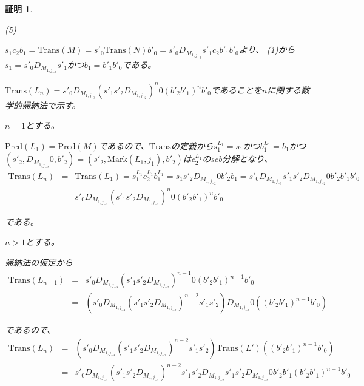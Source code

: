 \documentclass[dvipdfmx,uplatex]{jsarticle}
\theoremstyle{customnonumberbreakfortheorem}
\theoremstyle{customnonumberbreakforproof}
\newtheorem{hideableproof}{証明}
\begin{document}
\begin{hideableproof}
\begin{indented}
		\item
		\item (5)
		\item \(s_1 c_2 b_1 = \textrm{Trans}(M) = s'_0 \textrm{Trans}(N) b'_0 = s'_0 D_{M_{1,j_{-3}}} s'_1 c_2 b'_1 b'_0\)より、 (1)から\(s_1 = s'_0 D_{M_{1,j_{-3}}} s'_1\)かつ\(b_1 = b'_1 b'_0\)である。
		\item \(\textrm{Trans}(L_n) = s'_0 D_{M_{1,j_{-3}}} (s'_1 s'_2 D_{M_{1,j_{-2}}})^n 0 (b'_2 b'_1)^n b'_0\)であることを\(n\)に関する数学的帰納法で示す。
		\item \(n = 1\)とする。
		\begin{indented}
			\item \(\textrm{Pred}(L_1) = \textrm{Pred}(M)\)であるので、\(\textrm{Trans}\)の定義から\(s_1^{L_1} = s_1\)かつ\(b_1^{L_1} = b_1\)かつ\((s'_2,D_{M_{1,j_{-2}}} 0,b'_2) = (s'_2,\textrm{Mark}(L_1,j_1),b'_2)\)は\(c_2^{L_1}\)のscb分解となり、
			\begin{eqnarray*}
			\textrm{Trans}(L_n) & = & \textrm{Trans}(L_1) = s_1^{L_1} c_2^{L_1} b_1^{L_1} = s_1 s'_2 D_{M_{1,j_{-2}}} 0 b'_2 b_1 = s'_0 D_{M_{1,j_{-3}}} s'_1 s'_2 D_{M_{1,j_{-2}}} 0 b'_2 b'_1 b'_0 \\
			& = & s'_0 D_{M_{1,j_{-3}}} (s'_1 s'_2 D_{M_{1,j_{-2}}})^n 0 (b'_2 b'_1)^n b'_0
			\end{eqnarray*}
			\item である。
		\end{indented}
		\item
		\item \(n > 1\)とする。
		\begin{indented}
			\item 帰納法の仮定から
			\begin{eqnarray*}
			\textrm{Trans}(L_{n-1}) & = & s'_0 D_{M_{1,j_{-3}}} (s'_1 s'_2 D_{M_{1,j_{-2}}})^{n-1} 0 (b'_2 b'_1)^{n-1} b'_0 \\
			& = & (s'_0 D_{M_{1,j_{-3}}} (s'_1 s'_2 D_{M_{1,j_{-2}}})^{n-2} s'_1 s'_2) D_{M_{1,j_{-2}}} 0 ((b'_2 b'_1)^{n-1} b'_0)
			\end{eqnarray*}
			\item であるので、
			\begin{eqnarray*}
			\textrm{Trans}(L_n) & = & (s'_0 D_{M_{1,j_{-3}}} (s'_1 s'_2 D_{M_{1,j_{-2}}})^{n-2} s'_1 s'_2) \textrm{Trans}(L') ((b'_2 b'_1)^{n-1} b'_0)  \\
			& = & s'_0 D_{M_{1,j_{-3}}} (s'_1 s'_2 D_{M_{1,j_{-2}}})^{n-2} s'_1 s'_2 D_{M_{1,j_{-2}}} s'_1 s'_2 D_{M_{1,j_{-2}}} 0 b'_2 b'_1 (b'_2 b'_1)^{n-1} b'_0 \\

\end{eqnarray*}
\end{indented}
\end{indented}
\end{hideableproof}
\end{document}
